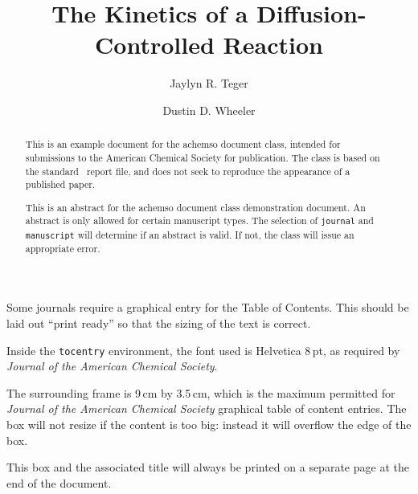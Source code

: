 \documentclass[journal=jpca,manuscript=article]{achemso}
\author{Jaylyn R. Teger}
\author{Dustin D. Wheeler}
\affiliation[Hunter College]
{Department of Chemistry, CUNY -- Hunter College, New York, NY}
\title[Lab 1 -- Fluorescence]
  {The Kinetics of a Diffusion-Controlled Reaction}
\begin{document}
\begin{tocentry}

Some journals require a graphical entry for the Table of Contents.
This should be laid out ``print ready'' so that the sizing of the
text is correct.

Inside the \texttt{tocentry} environment, the font used is Helvetica
8\,pt, as required by \emph{Journal of the American Chemical
Society}.

The surrounding frame is 9\,cm by 3.5\,cm, which is the maximum
permitted for  \emph{Journal of the American Chemical Society}
graphical table of content entries. The box will not resize if the
content is too big: instead it will overflow the edge of the box.

This box and the associated title will always be printed on a
separate page at the end of the document.

\end{tocentry}

\begin{abstract}
  This is an example document for the \textsf{achemso} document
  class, intended for submissions to the American Chemical Society
  for publication. The class is based on the standard \LaTeXe\
  \textsf{report} file, and does not seek to reproduce the appearance
  of a published paper.

  This is an abstract for the \textsf{achemso} document class
  demonstration document.  An abstract is only allowed for certain
  manuscript types.  The selection of \texttt{journal} and
  \texttt{manuscript} will determine if an abstract is valid.  If
  not, the class will issue an appropriate error.
\end{abstract}

\end{document}
